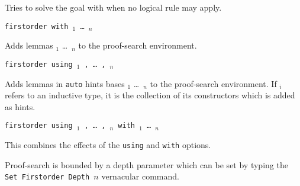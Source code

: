 \begin{coq_example*}
\begin{Variants}
   Tries to solve the goal with {\tac} when no logical rule may apply.

 \item {\tt firstorder with \ident$_1$ \dots\ \ident$_n$ }

   Adds lemmas \ident$_1$ \dots\ \ident$_n$ to the proof-search
   environment.

 \item {\tt firstorder using {\qualid}$_1$ , \dots\ , {\qualid}$_n$ }

   Adds lemmas in {\tt auto} hints bases {\qualid}$_1$ \dots\ {\qualid}$_n$
   to the proof-search environment. If {\qualid}$_i$ refers to an inductive
   type, it is the collection of its constructors which is added as hints.

\item \texttt{firstorder using {\qualid}$_1$ , \dots\ , {\qualid}$_n$ with \ident$_1$ \dots\ \ident$_n$}

  This combines the effects of the {\tt using} and {\tt with} options.

\end{Variants}

Proof-search is bounded by a depth parameter which can be set by typing the
{\nobreak \tt Set Firstorder Depth $n$} 
vernacular command.







\end{coq_example*}
